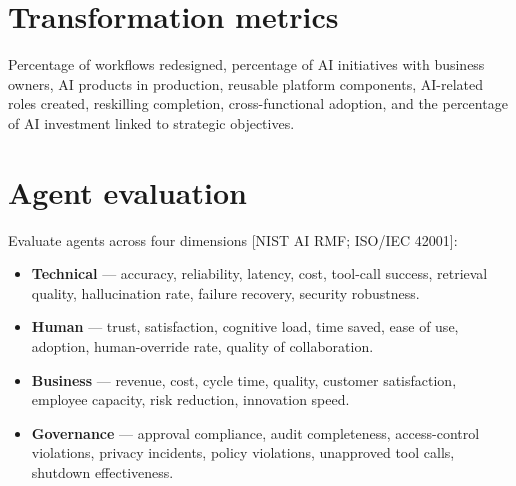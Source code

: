 \begin{center}
  \renewcommand{\arraystretch}{1.5}
\end{center}

\section{Transformation metrics}

Percentage of workflows redesigned, percentage of AI initiatives with business
owners, AI products in production, reusable platform components, AI-related
roles created, reskilling completion, cross-functional adoption, and the
percentage of AI investment linked to strategic objectives.

\section{Agent evaluation}

Evaluate agents across four dimensions [NIST AI RMF; ISO/IEC 42001]:

\begin{itemize}
  \item \textbf{Technical} — accuracy, reliability, latency, cost,
        tool-call success, retrieval quality, hallucination rate, failure
        recovery, security robustness.
  \item \textbf{Human} — trust, satisfaction, cognitive load, time saved,
        ease of use, adoption, human-override rate, quality of collaboration.
  \item \textbf{Business} — revenue, cost, cycle time, quality, customer
        satisfaction, employee capacity, risk reduction, innovation speed.
  \item \textbf{Governance} — approval compliance, audit completeness,
        access-control violations, privacy incidents, policy violations,
        unapproved tool calls, shutdown effectiveness.
\end{itemize}

